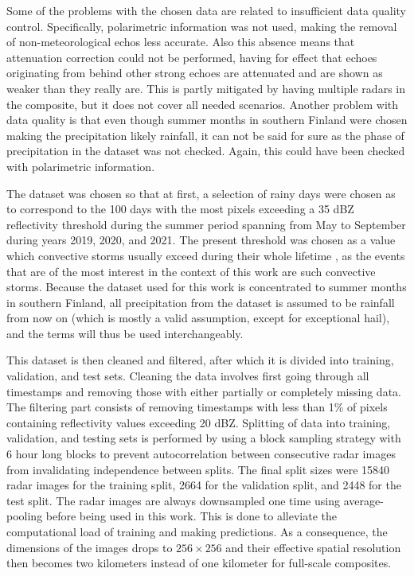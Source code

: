 Some of the problems with the chosen data are related to insufficient data quality control. Specifically, polarimetric information was not used, making the removal of non-meteorological echos less accurate. Also this absence means that attenuation correction could not be performed, having for effect that echoes originating from behind other strong echoes are attenuated and are shown as weaker than they really are. This is partly mitigated by having multiple radars in the composite, but it does not cover all needed scenarios. Another problem with data quality is that even though summer months in southern Finland were chosen making the precipitation likely rainfall, it can not be said for sure as the phase of precipitation in the dataset was not checked. Again, this could have been checked with polarimetric information.



The dataset was chosen so that at first, a selection of rainy days were chosen as to correspond to the 100 days with the most pixels exceeding a 35 dBZ reflectivity threshold during the summer period spanning from May to September during years 2019, 2020, and 2021. The present threshold was chosen as a value which convective storms usually exceed during their whole lifetime \cite{voormansik_thunderstorm_2017}, as the events that are of the most interest in the context of this work are such convective storms. Because the dataset used for this work is concentrated to summer months in southern Finland, all precipitation from the dataset is assumed to be rainfall from now on (which is mostly a valid assumption, except for exceptional hail), and the terms will thus be used interchangeably. 

This dataset is then cleaned and filtered, after which it is divided into training, validation, and test sets. Cleaning the data involves first going through all timestamps and removing those with either partially or completely missing data. The filtering part consists of removing timestamps with less than 1\% of pixels containing reflectivity values exceeding 20 dBZ. Splitting of data into training, validation, and testing sets is performed by using a block sampling strategy \cite{schultz_can_2021} with 6 hour long blocks to prevent autocorrelation between consecutive radar images from invalidating independence between splits. The final split sizes were 15840 radar images for the training split, 2664 for the validation split, and 2448 for the test split. The radar images are always downsampled one time using average-pooling before being used in this work. This is done to alleviate the computational load of training and making predictions. As a consequence, the dimensions of the images drops to $256 \times 256$ and their effective spatial resolution then becomes two kilometers instead of one kilometer for full-scale composites. 

